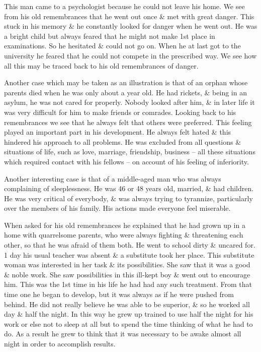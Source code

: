 \documentclass{article}
\begin{document}
This man came to a psychologist because he could not leave his home. We see from his old remembrances that he went out once \& met with great danger. This stuck in his memory \& he constantly looked for danger when he went out. He was a bright child but always feared that he might not make 1st place in examinations. So he hesitated \& could not go on. When he at last got to the university he feared that he could not compete in the prescribed way. We see how all this may be traced back to his old remembrances of danger.

Another case which may be taken as an illustration is that of an orphan whose parents died when he was only about a year old. He had rickets, \& being in an asylum, he was not cared for properly. Nobody looked after him, \& in later life it was very difficult for him to make friends or comrades. Looking back to his remembrances we see that he always felt that others were preferred. This feeling played an important part in his development. He always felt hated \& this hindered his approach to all problems. He was excluded from all questions \& situations of life, such as love, marriage, friendship, business -- all these situations which required contact with his fellows -- on account of his feeling of inferiority.

Another interesting case is that of a middle-aged man who was always complaining of sleeplessness. He was 46 or 48 years old, married, \& had children. He was very critical of everybody, \& was always trying to tyrannize, particularly over the members of his family. His actions made everyone feel miserable.

When asked for his old remembrances he explained that he had grown up in a home with quarrelsome parents, who were always fighting \& threatening each other, so that he was afraid of them both. He went to school dirty \& uncared for. 1 day his usual teacher was absent \& a substitute took her place. This substitute woman was interested in her task \& its possibilities. She saw that it was a good \& noble work. She saw possibilities in this ill-kept boy \& went out to encourage him. This was the 1st time in his life he had had any such treatment. From that time one he began to develop, but it was always as if he were pushed from behind. He did not really believe he was able to be superior, \& so he worked all day \& half the night. In this way he grew up trained to use half the night for his work or else not to sleep at all but to spend the time thinking of what he had to do. As a result he grew to think that it was necessary to be awake almost all night in order to accomplish results.
\end{document}
